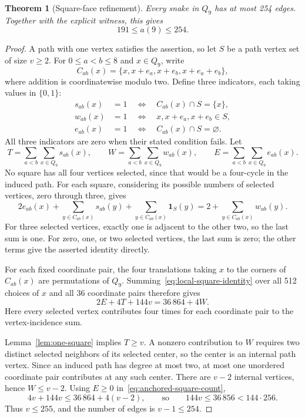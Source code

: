 \documentclass[11pt,a4paper]{article}
\newtheorem{theorem}{Theorem}[section]
\theoremstyle{definition}
\theoremstyle{remark}
\newcommand{\Q}{Q}
\begin{document}
\begin{theorem}[Square-face refinement]\label{thm:square-upper}
Every snake in $\Q_9$ has at most 254 edges. Together with the explicit witness, this gives
\[
\boxed{191\le a(9)\le254.}
\]
\end{theorem}
\begin{proof}
A path with one vertex satisfies the assertion, so let $S$ be a path vertex set of size $v\ge2$. For $0\le a<b\le8$ and $x\in\Q_9$, write
\[
C_{ab}(x)=\{x,x+e_a,x+e_b,x+e_a+e_b\},
\]
where addition is coordinatewise modulo two. Define three indicators, each taking values in $\{0,1\}$:
\begin{align*}
s_{ab}(x)&=1\quad\Longleftrightarrow\quad C_{ab}(x)\cap S=\{x\},\\
w_{ab}(x)&=1\quad\Longleftrightarrow\quad x,x+e_a,x+e_b\in S,\\
e_{ab}(x)&=1\quad\Longleftrightarrow\quad C_{ab}(x)\cap S=\varnothing.
\end{align*}
All three indicators are zero when their stated condition fails. Let
\[
T=\sum_{a<b}\sum_{x\in\Q_9}s_{ab}(x),\qquad
W=\sum_{a<b}\sum_{x\in\Q_9}w_{ab}(x),\qquad
E=\sum_{a<b}\sum_{x\in\Q_9}e_{ab}(x).
\]
No square has all four vertices selected, since that would be a four-cycle in the induced path. For each square, considering its possible numbers of selected vertices, zero through three, gives
\begin{equation}\label{eq:local-square-identity}
2e_{ab}(x)+\sum_{y\in C_{ab}(x)}s_{ab}(y)
 +\sum_{y\in C_{ab}(x)}\mathbf{1}_S(y)
=2+\sum_{y\in C_{ab}(x)}w_{ab}(y).
\end{equation}
For three selected vertices, exactly one is adjacent to the other two, so the last sum is one. For zero, one, or two selected vertices, the last sum is zero; the other terms give the asserted identity directly.

For each fixed coordinate pair, the four translations taking $x$ to the corners of $C_{ab}(x)$ are permutations of $\Q_9$. Summing~\eqref{eq:local-square-identity} over all 512 choices of $x$ and all 36 coordinate pairs therefore gives
\begin{equation}\label{eq:anchored-square-count}
2E+4T+144v=36\,864+4W.
\end{equation}
Here every selected vertex contributes four times for each coordinate pair to the vertex-incidence sum.

Lemma~\ref{lem:one-square} implies $T\ge v$. A nonzero contribution to $W$ requires two distinct selected neighbors of its selected center, so the center is an internal path vertex. Since an induced path has degree at most two, at most one unordered coordinate pair contributes at any such center. There are $v-2$ internal vertices, hence $W\le v-2$. Using $E\ge0$ in~\eqref{eq:anchored-square-count},
\[
4v+144v\le36\,864+4(v-2),
\qquad\text{so}\qquad144v\le36\,856<144\cdot256.
\]
Thus $v\le255$, and the number of edges is $v-1\le254$.
\end{proof}
\end{document}
